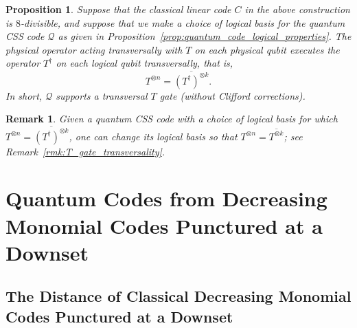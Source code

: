 \documentclass{article}
\newcounter{main}[section]
\newtheorem{proposition}[main]{Proposition}
\newtheorem{remark}[main]{Remark}
\begin{document}
\begin{proposition}\label{prop:quantum_code_transversality_from_divisibility}
    Suppose that the classical linear code $C$ in the above construction is $8$-divisible, and suppose that we make a choice of logical basis for the quantum CSS code $\mathcal{Q}$ as given in Proposition~\ref{prop:quantum_code_logical_properties}. The physical operator acting transversally with $T$ on each physical qubit executes the operator $T^\dagger$ on each logical qubit transversally, that is,
    \begin{equation}
        T^{\otimes n} = \overline{(T^\dagger)^{\otimes k}}.
    \end{equation}
    In short, $\mathcal{Q}$ supports a transversal $T$ gate (without Clifford corrections).
\end{proposition}
\begin{remark}
    Given a quantum CSS code with a choice of logical basis for which $T^{\otimes n} = \overline{(T^\dagger)^{\otimes k}}$, one can change its logical basis so that $T^{\otimes n} = \overline{T^{\otimes k}}$; see Remark~\ref{rmk:T_gate_transversality}.
\end{remark}


\section{Quantum Codes from Decreasing Monomial Codes Punctured at a Downset}

\subsection{The Distance of Classical Decreasing Monomial Codes Punctured at a Downset}
\end{document}

